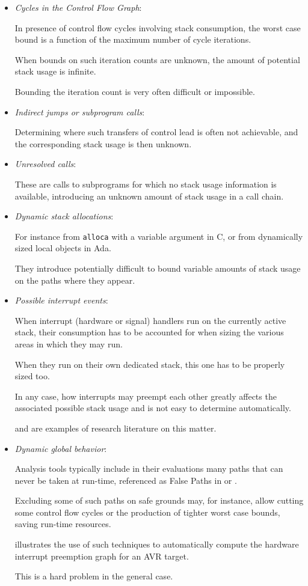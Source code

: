 \begin{itemize}

\item {\it Cycles in the Control Flow Graph}:

In presence of control flow cycles involving stack consumption, the worst case
bound is a function of the maximum number of cycle iterations.

When bounds on such iteration counts are unknown, the amount of potential
stack usage is infinite.

Bounding the iteration count is very often difficult or impossible.

\item {\it Indirect jumps or subprogram calls}:

Determining where such transfers of control lead is often not achievable,
and the corresponding stack usage is then unknown.

\item
{\it Unresolved calls}:

These are calls to subprograms for which no stack usage information is
available, introducing an unknown amount of stack usage in a call chain.

\item {\it Dynamic stack allocations}:

For instance from {\tt alloca} with a variable argument in C, or from
dynamically sized local objects in Ada.

They introduce potentially difficult to bound variable amounts of stack usage
on the paths where they appear.

\item {\it Possible interrupt events}:

When interrupt (hardware or signal) handlers run on the currently active
stack, their consumption has to be accounted for when sizing the various areas
in which they may run.

When they run on their own dedicated stack, this one has to be properly sized
too.

In any case, how interrupts may preempt each other greatly affects the
associated possible stack usage and is not easy to determine automatically.

\cite{pal:icse-01, pal:ftrtft-02, pal:sas-03} and
\cite{reg:emsoft-03} are examples of research literature on this matter.

\item {\it Dynamic global behavior}:

Analysis tools typically include in their evaluations many paths that can
never be taken at run-time, referenced as False Paths in \cite{bry:thesis} or
\cite{alt:erts-96}.

Excluding some of such paths on safe grounds may, for instance, allow cutting
some control flow cycles or the production of tighter worst case bounds,
saving run-time resources.

\cite {reg:emsoft-03} illustrates the use of such techniques to automatically
compute the hardware interrupt preemption graph for an AVR target.

This is a hard problem in the general case.

\end{itemize}

